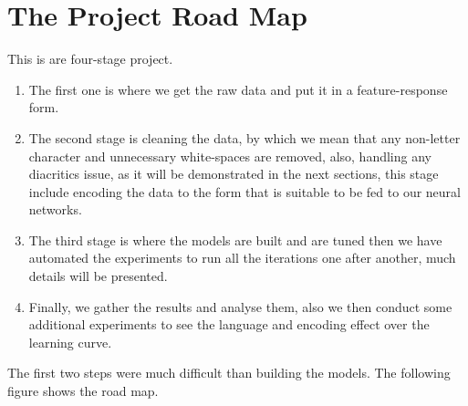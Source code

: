 \documentclass[12pt]{report}
\begin{document}
\section{The Project Road Map}
This is are four-stage project. 

\begin{enumerate}
    \item The first one is where we get the raw data and put it in a
            feature-response form.
    \item The second stage is cleaning the data, by which we mean that any
            non-letter character and unnecessary white-spaces are removed, also, handling any
            diacritics issue, as it will be demonstrated in the next sections, this stage
            include encoding the data to the form that is suitable to be fed to our neural
            networks.
    \item The third stage is where the models are built and are tuned then we
            have automated the experiments to run all the iterations one after another, much
            details will be presented.
    \item Finally, we gather the results and analyse them, also we then conduct
            some additional experiments to see the language and encoding effect over the
            learning curve.
\end{enumerate}

 

The first two steps were much difficult than
building the models. The following figure shows the road map.

\begin{center}
\end{center}
\end{document}
